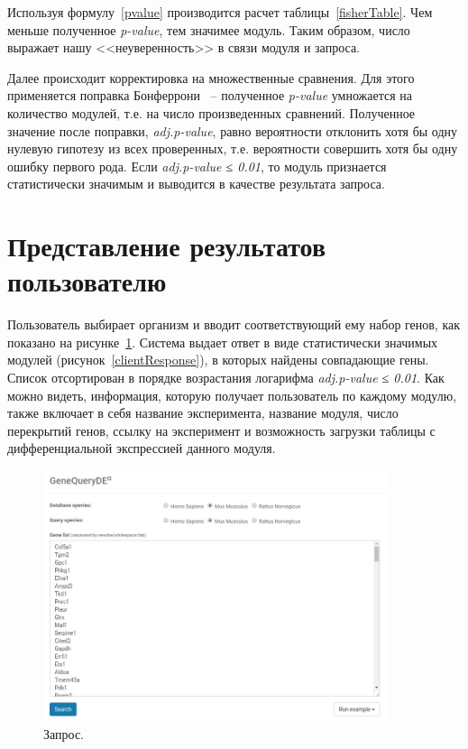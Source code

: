 \documentclass[times,specification,annotation]{itmo-student-thesis}
\begin{document}
Используя формулу~\ref{pvalue} производится расчет таблицы~\ref{fisherTable}. Чем меньше полученное \textit{p-value}, тем значимее модуль. Таким образом, число выражает нашу <<неуверенность>> в связи модуля и запроса. 

Далее происходит корректировка на множественные сравнения. Для этого применяется поправка Бонферрони\cite{Bonferroni} ~-- полученное \textit{p-value} умножается на количество модулей, т.е. на число произведенных сравнений. Полученное значение после поправки, \textit{adj.p-value}, равно вероятности отклонить хотя бы одну нулевую гипотезу из всех проверенных, т.е. вероятности совершить хотя бы одну ошибку первого рода. Если \textit{adj.p-value ≤ 0.01}, то модуль признается статистически значимым и выводится в качестве результата запроса.

\section{Представление результатов пользователю}

Пользователь выбирает организм и вводит соответствующий ему набор генов, как показано на рисунке~\ref{clientRequest}. Система выдает ответ в виде статистически значимых модулей (рисунок~\ref{clientResponse}), в которых найдены совпадающие гены. Список отсортирован в порядке возрастания логарифма \textit{adj.p-value ≤ 0.01}. Как можно видеть, информация, которую получает пользователь по каждому модулю, также включает в себя название эксперимента, название модуля, число перекрытий генов, ссылку на эксперимент и возможность загрузки таблицы с дифференциальной экспрессией данного модуля.

\begin{figure}[!h]
    \caption{Запрос.}\label{clientRequest}
    \centering
    \includegraphics[width=0.9\textwidth]{request.jpg}
\end{figure}
\end{document}
